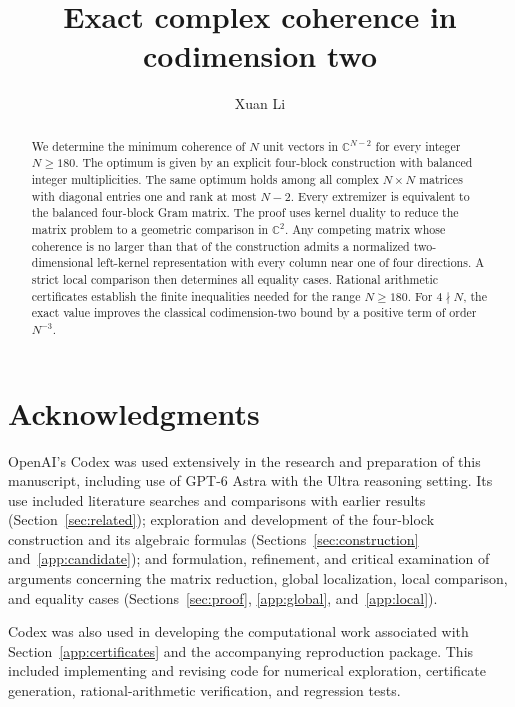\documentclass[11pt]{article}
\title{Exact complex coherence in codimension two}
\author{Xuan Li}
\date{}
\numberwithin{equation}{section}
\theoremstyle{definition}
\theoremstyle{remark}
\begin{document}
\maketitle
\begin{abstract}
We determine the minimum coherence of $N$ unit vectors in
$\mathbb C^{N-2}$ for every integer $N\ge180$. The optimum is given by
an explicit four-block construction with balanced integer multiplicities.
The same optimum holds among all complex $N\times N$ matrices with
diagonal entries one and rank at most $N-2$. Every extremizer is equivalent to the
balanced four-block Gram matrix. The proof uses kernel duality to reduce
the matrix problem to a geometric comparison in $\mathbb C^2$.
Any competing matrix whose coherence is no larger than that of the
construction admits a normalized two-dimensional left-kernel
representation with every column near one of four directions.
A strict local comparison then determines all equality cases.
Rational arithmetic certificates establish the finite inequalities needed
for the range $N\ge180$. For $4\nmid N$, the exact value improves the
classical codimension-two bound by a positive term of order $N^{-3}$.
\end{abstract}
\setcounter{tocdepth}{2}
\tableofcontents
\clearpage










\section*{Acknowledgments}
OpenAI's Codex was used extensively in the research and preparation of this
manuscript, including use of GPT-6 Astra with the Ultra reasoning setting.
Its use included literature searches and
comparisons with earlier results (Section~\ref{sec:related}); exploration
and development of the four-block construction and its algebraic formulas
(Sections~\ref{sec:construction} and~\ref{app:candidate}); and formulation,
refinement, and critical examination of arguments concerning the matrix
reduction, global localization, local comparison, and equality cases
(Sections~\ref{sec:proof}, \ref{app:global}, and~\ref{app:local}).

Codex was also used in developing the computational work associated
with Section~\ref{app:certificates} and the accompanying reproduction
package. This included implementing and revising code for numerical
exploration, certificate generation, rational-arithmetic verification,
and regression tests.
\end{document}
